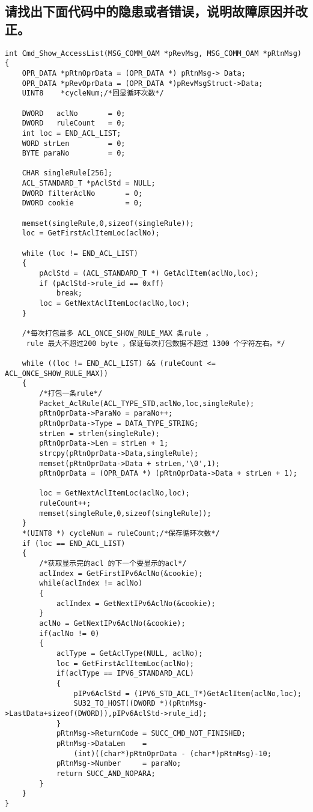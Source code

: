 ﻿\documentclass  [11pt,twocolumn,landscape]{article}
\begin{document}
\subsection{请找出下面代码中的隐患或者错误，说明故障原因并改正。}
\begin{lstlisting}
int Cmd_Show_AccessList(MSG_COMM_OAM *pRevMsg, MSG_COMM_OAM *pRtnMsg)
{
    OPR_DATA *pRtnOprData = (OPR_DATA *) pRtnMsg-> Data;    
    OPR_DATA *pRevOprData = (OPR_DATA *)pRevMsgStruct->Data;
    UINT8    *cycleNum;/*回显循环次数*/

    DWORD   aclNo       = 0;
    DWORD   ruleCount   = 0;
    int loc = END_ACL_LIST;
    WORD strLen         = 0;
    BYTE paraNo         = 0;  

    CHAR singleRule[256];
    ACL_STANDARD_T *pAclStd = NULL;
    DWORD filterAclNo       = 0;	
    DWORD cookie            = 0;

    memset(singleRule,0,sizeof(singleRule));
    loc = GetFirstAclItemLoc(aclNo);

    while (loc != END_ACL_LIST)
    {
        pAclStd = (ACL_STANDARD_T *) GetAclItem(aclNo,loc);
        if (pAclStd->rule_id == 0xff)
            break;
        loc = GetNextAclItemLoc(aclNo,loc);
    }

    /*每次打包最多 ACL_ONCE_SHOW_RULE_MAX 条rule ，
     rule 最大不超过200 byte ，保证每次打包数据不超过 1300 个字符左右。*/

    while ((loc != END_ACL_LIST) && (ruleCount <= ACL_ONCE_SHOW_RULE_MAX))
    {
        /*打包一条rule*/
        Packet_AclRule(ACL_TYPE_STD,aclNo,loc,singleRule);
        pRtnOprData->ParaNo = paraNo++;
		pRtnOprData->Type = DATA_TYPE_STRING;
		strLen = strlen(singleRule);
		pRtnOprData->Len = strLen + 1;
		strcpy(pRtnOprData->Data,singleRule);
		memset(pRtnOprData->Data + strLen,'\0',1);
		pRtnOprData = (OPR_DATA *) (pRtnOprData->Data + strLen + 1);
		
        loc = GetNextAclItemLoc(aclNo,loc);
        ruleCount++;
        memset(singleRule,0,sizeof(singleRule));
    }
    *(UINT8 *) cycleNum = ruleCount;/*保存循环次数*/ 
    if (loc == END_ACL_LIST)
    {
        /*获取显示完的acl 的下一个要显示的acl*/
        aclIndex = GetFirstIPv6AclNo(&cookie);
        while(aclIndex != aclNo)
        {
            aclIndex = GetNextIPv6AclNo(&cookie);
        }
		aclNo = GetNextIPv6AclNo(&cookie);
		if(aclNo != 0)
        {
            aclType = GetAclType(NULL, aclNo);
            loc = GetFirstAclItemLoc(aclNo);
            if(aclType == IPV6_STANDARD_ACL)
            {
                pIPv6AclStd = (IPV6_STD_ACL_T*)GetAclItem(aclNo,loc);
                SU32_TO_HOST((DWORD *)(pRtnMsg->LastData+sizeof(DWORD)),pIPv6AclStd->rule_id);
            }
            pRtnMsg->ReturnCode	= SUCC_CMD_NOT_FINISHED;
            pRtnMsg->DataLen	=
                (int)((char*)pRtnOprData - (char*)pRtnMsg)-10;
            pRtnMsg->Number	    = paraNo;
            return SUCC_AND_NOPARA;
        }
    }
}
\end{lstlisting}
\end{document}
